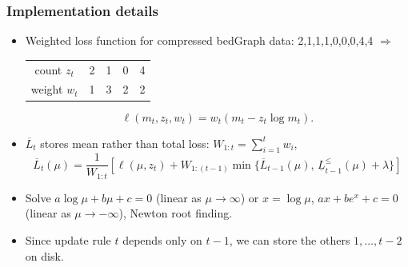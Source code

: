 \documentclass{beamer}
\begin{document}
\begin{frame}
  \frametitle{Implementation details}
  \begin{itemize}
  \item Weighted loss function for compressed bedGraph data: 2,1,1,1,0,0,0,4,4 $\Rightarrow$
    \begin{tabular}{ccccc}
      count $z_t$ & 2 & 1 & 0 & 4 \\
      weight $w_t$ & 1 & 3 & 2 & 2
    \end{tabular}
    \begin{equation*}
      \ell(m_t, z_t, w_t) = w_t(m_t - z_t\log m_t).
    \end{equation*}
  \item $\overline L_t$ stores mean rather than total loss: $W_{1:t}=\sum_{i=1}^t w_i$,
$$  \overline L_t(\mu) = \frac{1}{W_{1:t}} \left[\ell(\mu, z_t) + 
W_{1:(t-1)}
\min\{ \overline L_{t-1}(\mu),\, \underline L_{t-1}^\leq(\mu) + \lambda \}\right]$$
\item Solve $a\log\mu + b\mu + c = 0$ (linear as
  $\mu\rightarrow\infty$) or $x=\log \mu$, $a x + be^x + c = 0$ (linear as
  $\mu\rightarrow -\infty$), Newton root finding.
\item Since update rule $t$ depends only on $t-1$, we can store the
  others $1,\dots,t-2$ on disk.
  \end{itemize}
\end{frame}
\end{document}
